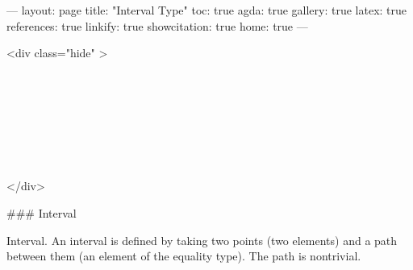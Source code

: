 ---
layout: page
title: "Interval Type"
toc: true
agda: true
gallery: true
latex: true
references: true
linkify: true
showcitation: true
home: true
---

<div class="hide" >
\begin{code}%
\>[0]\AgdaSymbol{\{-\#}\AgdaSpace{}%
\AgdaSpace{}%
\AgdaSpace{}%
\AgdaSymbol{\#-\}}\<%
\\
\>[0]\AgdaSpace{}%
\AgdaSpace{}%
\<%
\\
\>[0]\AgdaSpace{}%
\AgdaSpace{}%
\<%
\\
%
\\[\AgdaEmptyExtraSkip]%
\>[0]\AgdaSpace{}%
\AgdaSpace{}%
\<%
\\
\>[0]\AgdaSpace{}%
\AgdaSpace{}%
\<%
\\
\>[0]\AgdaSpace{}%
\AgdaSpace{}%
\<%
\end{code}
</div>

### Interval

Interval. An interval is defined by taking two points (two elements) and a path
between them (an element of the equality type). The path is nontrivial.

